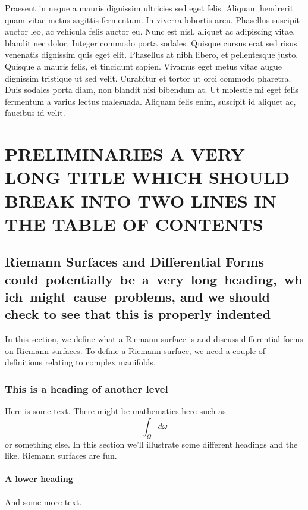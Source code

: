 \documentclass[12pt,oneside,final]{siuethesis}
\theoremstyle{definition}
\begin{document}
Praesent in neque a mauris dignissim ultricies sed eget felis. Aliquam hendrerit quam vitae metus sagittis fermentum. In viverra lobortis arcu. Phasellus suscipit auctor leo, ac vehicula felis auctor eu. Nunc est nisl, aliquet ac adipiscing vitae, blandit nec dolor. Integer commodo porta sodales. Quisque cursus erat sed risus venenatis dignissim quis eget elit. Phasellus at nibh libero, et pellentesque justo. Quisque a mauris felis, et tincidunt sapien. Vivamus eget metus vitae augue dignissim tristique ut sed velit. Curabitur et tortor ut orci commodo pharetra. Duis sodales porta diam, non blandit nisi bibendum at. Ut molestie mi eget felis fermentum a varius lectus malesuada. Aliquam felis enim, suscipit id aliquet ac, faucibus id velit.

\chapter{PRELIMINARIES A VERY LONG TITLE WHICH SHOULD BREAK INTO TWO LINES IN THE TABLE OF CONTENTS}

\section{Riemann Surfaces and Differential Forms could\ potentially\ be\ a\ very\ long\ heading,\ which\ might\ cause\ problems, and we should check to see that this is properly indented}

In this section, we define what a Riemann surface is and discuss differential forms on Riemann surfaces. To define a Riemann surface, we need a couple of definitions relating to complex manifolds.

\subsection{This is a heading of another level}

Here is some text.  There might be mathematics here such as \[ \int_\Omega d\omega \] or something else.  In this section we'll illustrate some different headings and the like.  Riemann surfaces are fun.

\subsubsection{A lower heading}

And some more text.
\end{document}
